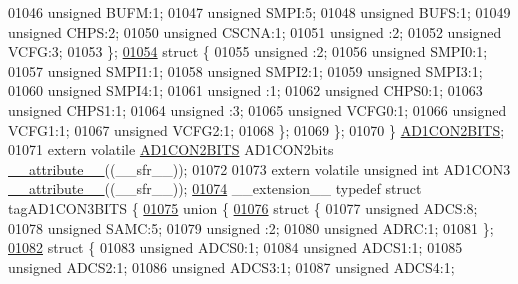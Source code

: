 \begin{DoxyCode}
01046       \textcolor{keywordtype}{unsigned} BUFM:1;
01047       \textcolor{keywordtype}{unsigned} SMPI:5;
01048       \textcolor{keywordtype}{unsigned} BUFS:1;
01049       \textcolor{keywordtype}{unsigned} CHPS:2;
01050       \textcolor{keywordtype}{unsigned} CSCNA:1;
01051       \textcolor{keywordtype}{unsigned} :2;
01052       \textcolor{keywordtype}{unsigned} VCFG:3;
01053     \};
\hypertarget{a00009_source_l01054}{}\hyperlink{a00009}{01054}     \textcolor{keyword}{struct }\{
01055       \textcolor{keywordtype}{unsigned} :2;
01056       \textcolor{keywordtype}{unsigned} SMPI0:1;
01057       \textcolor{keywordtype}{unsigned} SMPI1:1;
01058       \textcolor{keywordtype}{unsigned} SMPI2:1;
01059       \textcolor{keywordtype}{unsigned} SMPI3:1;
01060       \textcolor{keywordtype}{unsigned} SMPI4:1;
01061       \textcolor{keywordtype}{unsigned} :1;
01062       \textcolor{keywordtype}{unsigned} CHPS0:1;
01063       \textcolor{keywordtype}{unsigned} CHPS1:1;
01064       \textcolor{keywordtype}{unsigned} :3;
01065       \textcolor{keywordtype}{unsigned} VCFG0:1;
01066       \textcolor{keywordtype}{unsigned} VCFG1:1;
01067       \textcolor{keywordtype}{unsigned} VCFG2:1;
01068     \};
01069   \};
01070 \} \hyperlink{a00008_da/dec/a00080}{AD1CON2BITS};
01071 \textcolor{keyword}{extern} \textcolor{keyword}{volatile} \hyperlink{a00008_da/dec/a00080}{AD1CON2BITS} AD1CON2bits \hyperlink{a00009_a493c46f03454991ccc5aa7a6e1dfb2a7}{\_\_attribute\_\_}((\_\_sfr\_\_));
01072 
01073 \textcolor{keyword}{extern} \textcolor{keyword}{volatile} \textcolor{keywordtype}{unsigned} \textcolor{keywordtype}{int}  AD1CON3 \hyperlink{a00009_a493c46f03454991ccc5aa7a6e1dfb2a7}{\_\_attribute\_\_}((\_\_sfr\_\_));
\hypertarget{a00009_source_l01074}{}\hyperlink{a00008}{01074} \_\_extension\_\_ \textcolor{keyword}{typedef} \textcolor{keyword}{struct }tagAD1CON3BITS \{
\hypertarget{a00009_source_l01075}{}\hyperlink{a00009}{01075}   \textcolor{keyword}{union }\{
\hypertarget{a00009_source_l01076}{}\hyperlink{a00009}{01076}     \textcolor{keyword}{struct }\{
01077       \textcolor{keywordtype}{unsigned} ADCS:8;
01078       \textcolor{keywordtype}{unsigned} SAMC:5;
01079       \textcolor{keywordtype}{unsigned} :2;
01080       \textcolor{keywordtype}{unsigned} ADRC:1;
01081     \};
\hypertarget{a00009_source_l01082}{}\hyperlink{a00009}{01082}     \textcolor{keyword}{struct }\{
01083       \textcolor{keywordtype}{unsigned} ADCS0:1;
01084       \textcolor{keywordtype}{unsigned} ADCS1:1;
01085       \textcolor{keywordtype}{unsigned} ADCS2:1;
01086       \textcolor{keywordtype}{unsigned} ADCS3:1;
01087       \textcolor{keywordtype}{unsigned} ADCS4:1;

\end{DoxyCode}
